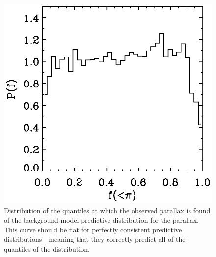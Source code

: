\clearpage
\begin{figure}
\includegraphics{figs_groups/back_quants.ps}
\caption[Distribution of the quantiles at which the observed parallax
  is found of the background-model predictive distribution for the
  parallax]{Distribution of the quantiles at which the observed
  parallax is found of the background-model predictive distribution
  for the parallax. This curve should be flat for perfectly consistent
  predictive distributions---meaning that they correctly predict all
  of the quantiles of the distribution.}\label{fig:back_quants}
\end{figure}


